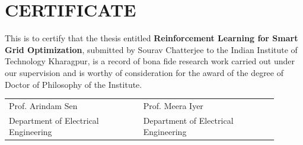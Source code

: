 \chapter*{CERTIFICATE}
This is to certify that the thesis entitled \textbf{Reinforcement Learning for Smart Grid Optimization}, submitted by
Sourav Chatterjee to the Indian Institute of Technology Kharagpur, is a record of bona fide
research work carried out under our supervision and is worthy of consideration for the award of
the degree of Doctor of Philosophy of the Institute.\par\vspace{1in}
\noindent\begin{tabular}{@{}p{0.45\linewidth}p{0.45\linewidth}@{}}
Prof. Arindam Sen & Prof. Meera Iyer\\
Department of Electrical Engineering & Department of Electrical Engineering
\end{tabular}
\clearpage

